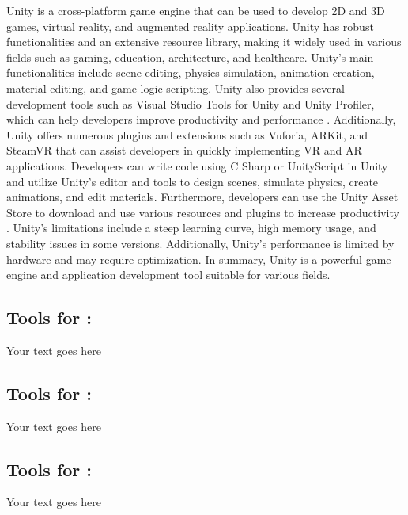 \documentclass[a4paper, 11pt]{report}
\begin{document}
Unity is a cross-platform game engine that can be used to develop 2D and 3D games, virtual reality, and augmented reality applications. Unity has robust functionalities and an extensive resource library, making it widely used in various fields such as gaming, education, architecture, and healthcare. Unity's main functionalities include scene editing, physics simulation, animation creation, material editing, and game logic scripting. Unity also provides several development tools such as Visual Studio Tools for Unity and Unity Profiler, which can help developers improve productivity and performance \cite{CodinBlack}. Additionally, Unity offers numerous plugins and extensions such as Vuforia, ARKit, and SteamVR that can assist developers in quickly implementing VR and AR applications\cite{GameDesigning}. Developers can write code using C Sharp or UnityScript in Unity and utilize Unity's editor and tools to design scenes, simulate physics, create animations, and edit materials. Furthermore, developers can use the Unity Asset Store to download and use various resources and plugins to increase productivity \cite{GameDesigning}. Unity's limitations include a steep learning curve, high memory usage, and stability issues in some versions\cite{BlackShellMedia.}. Additionally, Unity's performance is limited by hardware and may require optimization. In summary, Unity is a powerful game engine and application development tool suitable for various fields.


\subsection{Tools for \majB: \studB}

Your text goes here

\subsection{Tools for \majC: \studC}

Your text goes here

\subsection{Tools for \majD: \studD}

Your text goes here





\end{document}
